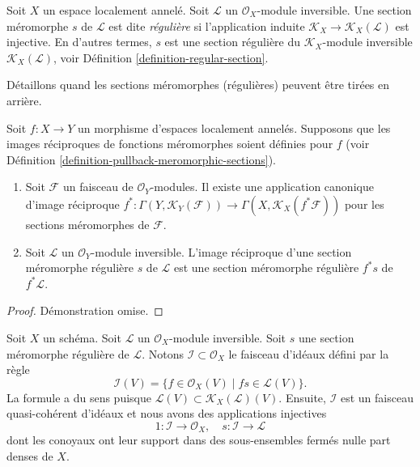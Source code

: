 \begin{definition}
\label{definition-regular-meromorphic-section}
Soit  $X$  un espace localement annelé. Soit  $\mathcal{L}$  un
 $\mathcal{O}_X$-module inversible. Une section méromorphe  $s$  de
 $\mathcal{L}$  est dite  {\it  régulière}  si
l'application induite  $\mathcal{K}_X \to \mathcal{K}_X(\mathcal{L})$  est injective. En d'autres termes,  $s$ 
est une section régulière du  $\mathcal{K}_X$-module inversible  $\mathcal{K}_X(\mathcal{L})$, voir
Définition  \ref{definition-regular-section}.
\end{definition}

\noindent
Détaillons quand les sections méromorphes (régulières) peuvent être tirées en
arrière.

\begin{lemma}
\label{lemma-meromorphic-sections-pullback}
Soit  $f : X \to Y$  un morphisme d'espaces localement annelés. Supposons que les
images réciproques de fonctions méromorphes soient définies pour  $f$ 
(voir Définition  \ref{definition-pullback-meromorphic-sections}).
\begin{enumerate}
\item Soit  $\mathcal{F}$  un faisceau de  $\mathcal{O}_Y$-modules. Il existe une application
canonique d'image réciproque  $f^* : \Gamma(Y, \mathcal{K}_Y(\mathcal{F})) \to
\Gamma(X, \mathcal{K}_X(f^*\mathcal{F}))$  pour les sections méromorphes de
 $\mathcal{F}$.
\item Soit  $\mathcal{L}$  un  $\mathcal{O}_Y$-module inversible. L'image réciproque d'une section méromorphe
régulière  $s$  de  $\mathcal{L}$  est une section
méromorphe régulière  $f^*s$  de  $f^*\mathcal{L}$.
\end{enumerate}
\end{lemma}

\begin{proof}
Démonstration omise.
\end{proof}

\begin{lemma}
\label{lemma-regular-meromorphic-ideal-denominators}
Soit  $X$  un schéma. Soit  $\mathcal{L}$  un  $\mathcal{O}_X$-module inversible.
Soit  $s$  une section méromorphe régulière de  $\mathcal{L}$. Notons
 $\mathcal{I} \subset \mathcal{O}_X$  le faisceau d'idéaux défini par la règle
$$
\mathcal{I}(V)
=
\{f \in \mathcal{O}_X(V) \mid fs \in \mathcal{L}(V)\}.
$$
La formule a du sens puisque  $\mathcal{L}(V) \subset \mathcal{K}_X(\mathcal{L})(V)$. Ensuite,  $\mathcal{I}$  est un faisceau
quasi-cohérent d'idéaux et nous avons des applications injectives
$$
1 : \mathcal{I} \longrightarrow \mathcal{O}_X,
\quad
s : \mathcal{I} \longrightarrow \mathcal{L}
$$
dont les conoyaux ont leur support dans des sous-ensembles fermés nulle part denses
de  $X$.
\end{lemma}

